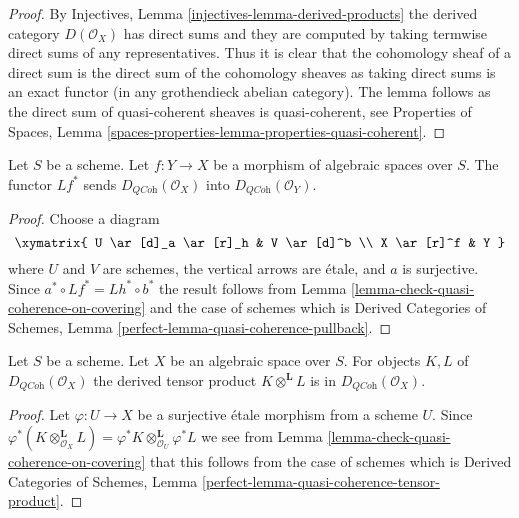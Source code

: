 \begin{proof}
By Injectives, Lemma \ref{injectives-lemma-derived-products}
the derived category $D(\mathcal{O}_X)$ has direct sums and
they are computed by taking termwise direct sums of any representatives.
Thus it is clear that the cohomology sheaf of a direct sum is the
direct sum of the cohomology sheaves as taking direct sums is
an exact functor (in any grothendieck abelian category). The lemma
follows as the direct sum of quasi-coherent sheaves is quasi-coherent, see
Properties of Spaces, Lemma
\ref{spaces-properties-lemma-properties-quasi-coherent}.
\end{proof}

\begin{lemma}
\label{lemma-quasi-coherence-pullback}
Let $S$ be a scheme.
Let $f : Y \to X$ be a morphism of algebraic spaces over $S$.
The functor $Lf^*$ sends $D_{\textit{QCoh}}(\mathcal{O}_X)$
into $D_{\textit{QCoh}}(\mathcal{O}_Y)$.
\end{lemma}

\begin{proof}
Choose a diagram
$$
\xymatrix{
U \ar[d]_a \ar[r]_h & V \ar[d]^b \\
X \ar[r]^f & Y
}
$$
where $U$ and $V$ are schemes, the vertical arrows are \'etale, and
$a$ is surjective. Since $a^* \circ Lf^* = Lh^* \circ b^*$ the result
follows from
Lemma \ref{lemma-check-quasi-coherence-on-covering}
and the case of schemes which is
Derived Categories of Schemes, Lemma
\ref{perfect-lemma-quasi-coherence-pullback}.
\end{proof}

\begin{lemma}
\label{lemma-quasi-coherence-tensor-product}
Let $S$ be a scheme. Let $X$ be an algebraic space over $S$.
For objects $K, L$ of $D_{\textit{QCoh}}(\mathcal{O}_X)$
the derived tensor product $K \otimes^\mathbf{L} L$ is in
$D_{\textit{QCoh}}(\mathcal{O}_X)$.
\end{lemma}

\begin{proof}
Let $\varphi : U \to X$ be a surjective \'etale morphism from a scheme $U$.
Since
$\varphi^*(K \otimes_{\mathcal{O}_X}^\mathbf{L} L) =
\varphi^*K \otimes_{\mathcal{O}_U}^\mathbf{L} \varphi^*L$
we see from
Lemma \ref{lemma-check-quasi-coherence-on-covering}
that this follows from the case of schemes which is
Derived Categories of Schemes, Lemma
\ref{perfect-lemma-quasi-coherence-tensor-product}.
\end{proof}

